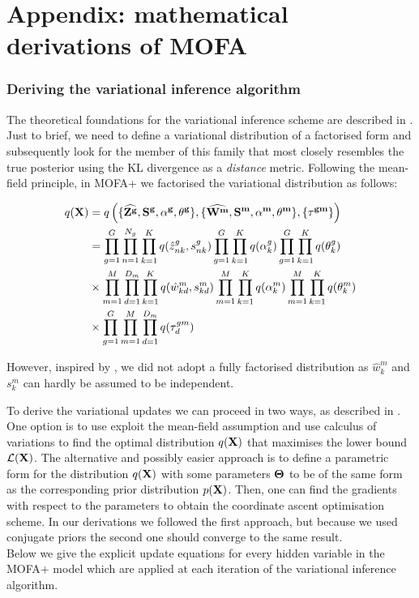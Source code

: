 \section{Appendix: mathematical derivations of MOFA}

\subsubsection{Deriving the variational inference algorithm}

The theoretical foundations for the variational inference scheme are described in . Just to brief, we need to define a variational distribution of a factorised form and subsequently look for the member of this family that most closely resembles the true posterior using the KL divergence as a \textit{distance} metric. Following the mean-field principle, in MOFA+ we factorised the variational distribution as follows:

\begin{equation} \begin{aligned}
	q({\bf X}) &= q \left(\{\widehat{{\bf Z}^{\bf g}}, {\bf S}^{\bf g}, \bf{\alpha^g}, \bf{\theta^g}\}, \{\widehat{{\bf W}^m}, {\bf S}^m, \bf\alpha^m, \bf\theta^m\}, \{ \bf\tau^{gm}\} \right)\\
	&= \prod_{g=1}^{G} \prod_{n=1}^{N_g} \prod_{k=1}^{K} q(\hat{z}_{nk}^g, s_{nk}^g) \prod_{g=1}^{G} \prod_{k=1}^{K} q(\alpha_k^g) \prod_{g=1}^{G} \prod_{k=1}^{K} q(\theta_k^g) \\
	&\times \prod_{m=1}^{M} \prod_{d=1}^{D_m} \prod_{k=1}^{K} q(\hat{w}_{kd}^m,s_{kd}^m) \prod_{m=1}^{M} \prod_{k=1}^{K} q(\alpha_k^m) \prod_{m=1}^{M} \prod_{k=1}^{K} q(\theta_k^m)  \\
	&\times \prod_{g=1}^{G} \prod_{m=1}^{M} \prod_{d=1}^{D_m} q(\tau_d^{gm})
\end{aligned} \end{equation}

However, inspired by \cite{Titsias2011}, we did not adopt a fully factorised distribution as $\hat{w}_k^m$ and $s_k^m$ can hardly be assumed to be independent.

To derive the variational updates we can proceed in two ways, as described in \label{section:variational_inference}. One option is to use exploit the  mean-field assumption and use calculus of variations to find the optimal distribution $q({\bf X})$ that maximises the lower bound $\mathcal{L}({\bf X})$\cite{Bishop,Murphy}. The alternative and possibly easier approach is to define a parametric form for the distribution $q({\bf X})$ with some parameters $\mbox{\boldmath $\Theta$}$ to be of the same form as the corresponding prior distribution $p({\bf X})$. Then, one can find the gradients with respect to the parameters to obtain the coordinate ascent optimisation scheme. In our derivations we followed the first approach, but because we used conjugate priors the second one should converge to the same result.\\
Below we give the explicit update equations for every hidden variable in the MOFA+ model which are applied at each iteration of the variational inference algorithm.

